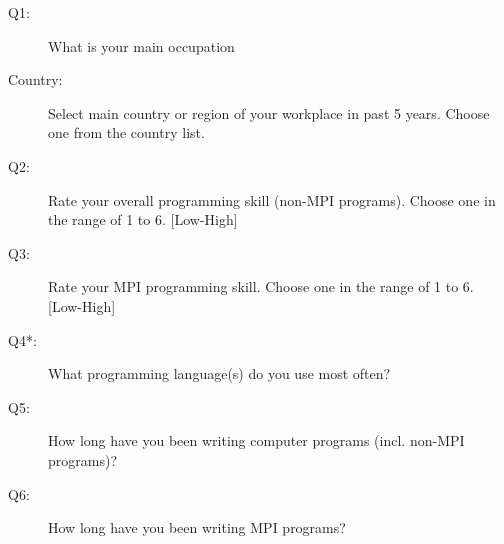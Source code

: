 \documentclass[preprint,5p,times]{elsarticle}
\begin{document}
{\small
  \begin{description}
  \item[Q1:] What is your main occupation
  \item[Country:] \hspace{3mm}Select main country or region of your workplace in past 5 years.
    Choose one from the country list.
  \item[Q2:] Rate your overall programming skill (non-MPI programs).
    Choose one in the range of 1 to 6. [Low-High]
  \item[Q3:] Rate your MPI programming skill.
    Choose one in the range of 1 to 6. [Low-High]
  \item[Q4*:] What programming language(s) do you use most often?
  \item[Q5:] How long have you been writing computer programs (incl. non-MPI programs)?
  \item[Q6:] How long have you been writing MPI programs?
    \begin{inparaenum}[{\bf C}1)]

\end{inparaenum}
\end{description}}
\end{document}
